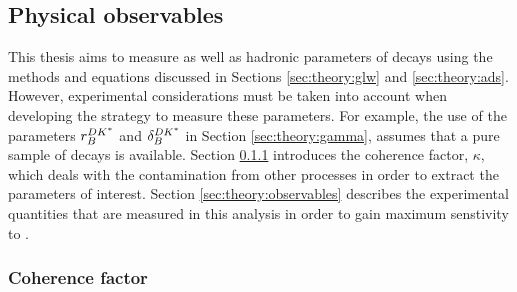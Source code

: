 \subsection{Physical observables}

This thesis aims to measure \Pgamma as well as hadronic parameters of \btodkst decays using the methods and equations discussed in Sections \ref{sec:theory:glw} and \ref{sec:theory:ads}. However, experimental considerations must be taken into account when developing the strategy to measure these parameters. For example, the use of the parameters $r_B^{DK^*}$ and $\delta_B^{DK^*}$ in Section \ref{sec:theory:gamma}, assumes that a pure sample of \btodkst decays is available. Section \ref{sec:theory:kappa} introduces the coherence factor, $\kappa$, which deals with the contamination from other \decay{\Bm}{\D\KS\pim} processes in order to extract the parameters of interest. Section \ref{sec:theory:observables} describes the experimental quantities that are measured in this analysis in order to gain maximum senstivity to \Pgamma. 

\subsubsection{Coherence factor}
\label{sec:theory:kappa}

